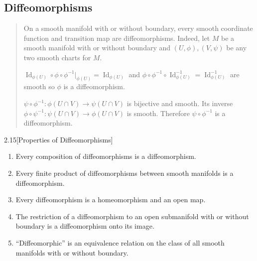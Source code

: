 \subsection{Diffeomorphisms}

\begin{quotation}
    On a smooth manifold with or without boundary, every smooth coordinate function and transition map are diffeomorphisms. Indeed, let \( M \) be a smooth manifold with or without boundary and \( (U, \phi), (V, \psi) \) be any two smooth charts for \( M \).

    \( \operatorname{Id}_{\phi(U)} \circ \phi \circ \phi^{-1}\vert_{\phi(U)} = \operatorname{Id}_{\phi(U)} \) and \( \phi \circ \phi^{-1} \circ \operatorname{Id}_{\phi(U)}^{-1} = \operatorname{Id}_{\phi(U)}^{-1} \) are smooth so \( \phi \) is a diffeomorphism.

    \( \psi \circ \phi^{-1}: \phi(U \cap V) \to \psi(U \cap V) \) is bijective and smooth. Its inverse \( \phi \circ \psi^{-1}: \psi(U \cap V) \to \phi(U \cap V) \) is smooth. Therefore \( \psi \circ \phi^{-1} \) is a diffeomorphism.
\end{quotation}

\begin{prop}{2.15}[Properties of Diffeomorphisms]
    \begin{enumerate}[itemsep=0pt,label={(\alph*)}]
        \item Every composition of diffeomorphisms is a diffeomorphism.
        \item Every finite product of diffeomorphisms between smooth manifolds is a diffeomorphism.
        \item Every diffeomorphism is a homeomorphism and an open map.
        \item The restriction of a diffeomorphism to an open submanifold with or without boundary is a diffeomorphism onto its image.
        \item ``Diffeomorphic'' is an equivalence relation on the class of all smooth manifolds with or without boundary.
    \end{enumerate}
\end{prop}

